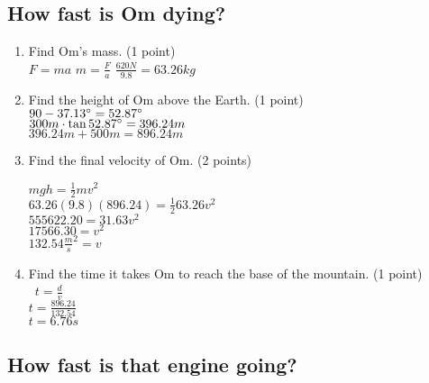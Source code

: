 \documentclass{article}
\begin{document}
\subsection{How fast is Om dying?}
\begin{enumerate}
    \item Find Om's mass. (1 point)\\
    \(F = ma\)
    \(m =\frac{F}{a}\)
    \(\frac{620N}{9.8}=63.26kg\)

    \item Find the height of Om above the Earth. (1 point) \\
    
    \(90-37.13\degree = 52.87\degree\) \\
    \(300m \cdot \tan 52.87\degree = 396.24m\) \\
    \(396.24m + 500m = 896.24m\)

    \item Find the final velocity of Om. (2 points) \\


    \(mgh = \frac{1}{2}mv^2\) \\
    \(63.26(9.8)(896.24) = \frac{1}{2}63.26v^2\) \\
    \(555622.20 = 31.63v^2\) \\
    \(17566.30 = v^2\) \\
    \(132.54\frac{m}{s}^2 = v\)

    \item Find the time it takes Om to reach the base of the mountain. (1 point) \\\
    \(t = \frac{d}{v}\) \\
    \(t = \frac{896.24}{132.54}\) \\
    \(t = 6.76s\)
\end{enumerate}

\subsection{How fast is that engine going?}
\end{document}
